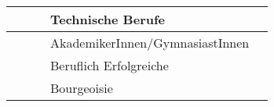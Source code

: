 \begin{longtable}{|l|l|l|l|l|l|}
     &                    &            & \multicolumn{2}{l|}{Technische Berufe}                      &                                                                                                                                                                                                                                                                                                                                                                                                                                                                                                                                                                                                                                                                                                         \\ \hline
     &                    &            & \multicolumn{2}{l|}{AkademikerInnen/GymnasiastInnen}        &                                                                                                                                                                                                                                                                                                                                                                                                                                                                                                                                                                                                                                                                                                         \\ \hline
     &                    &            & \multicolumn{2}{l|}{Beruflich Erfolgreiche}                 &                                                                                                                                                                                                                                                                                                                                                                                                                                                                                                                                                                                                                                                                                                         \\ \hline
     &                    &            & \multicolumn{2}{l|}{Bourgeoisie}                            &                                                                                                                                                                                                                                                                                                                                                                                                                                                                                                                                                                                                                                                                                                         \\ \hline

\end{longtable}
